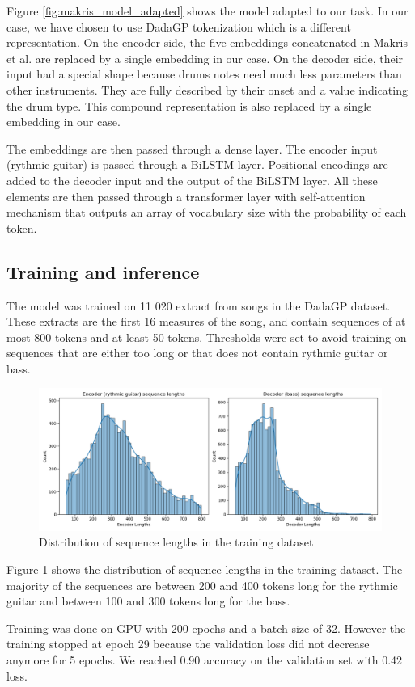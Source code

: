 Figure \ref{fig:makris_model_adapted} shows the model adapted to our task.
In our case, we have chosen to use DadaGP tokenization which is a different representation.
On the encoder side, the five embeddings concatenated in Makris et al. are replaced by a single embedding in our case.
On the decoder side, their input had a special shape because drums notes need much less parameters than other instruments.
They are fully described by their onset and a value indicating the drum type.
This compound representation is also replaced by a single embedding in our case.

The embeddings are then passed through a dense layer. The encoder input (rythmic guitar) is passed through a BiLSTM layer.
Positional encodings are added to the decoder input and the output of the BiLSTM layer.
All these elements are then passed through a transformer layer with self-attention mechanism
that outputs an array of vocabulary size with the probability of each token.

\subsection{Training and inference}

The model was trained on 11 020 extract from songs in the DadaGP dataset.
These extracts are the first 16 measures of the song, and contain sequences of at most 800 tokens and at least 50 tokens.
Thresholds were set to avoid training on sequences that are either too long or that does not contain rythmic guitar or bass.

\begin{figure}[!ht]
    \centering
    \includegraphics[width=.75\linewidth]{../images-figures/sequence_lengths_16_800_50.png}
    \caption{Distribution of sequence lengths in the training dataset}
    \label{fig:sequence_length_distribution}
\end{figure}

Figure \ref{fig:sequence_length_distribution} shows the distribution of sequence lengths in the training dataset.
The majority of the sequences are between 200 and 400 tokens long for the rythmic guitar and between 100 and 300 tokens long for the bass.

Training was done on GPU with 200 epochs and a batch size of 32.
However the training stopped at epoch 29 because the validation loss did not decrease anymore for 5 epochs.
We reached 0.90 accuracy on the validation set with 0.42 loss.